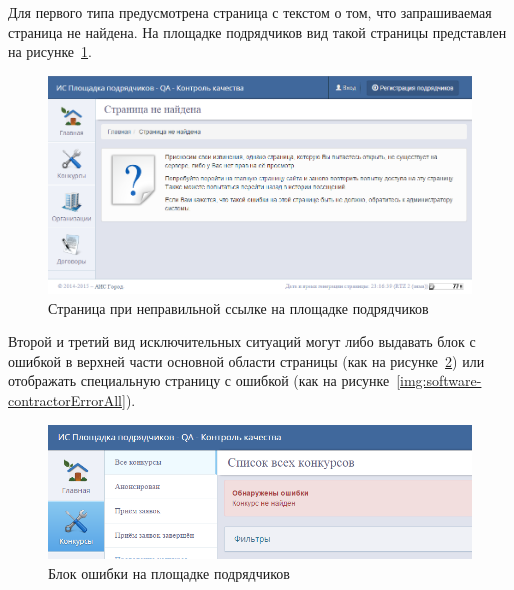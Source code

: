 Для первого типа предусмотрена страница с текстом о том, что запрашиваемая страница не найдена.
На площадке подрядчиков вид такой страницы представлен на рисунке~\ref{img:software-contractorNotFound}.

\begin{figure}[h!]
	\begin{center}
		\begin{minipage}[h]{\linewidth}
			\centering
			\includegraphics[width=\linewidth]{images/software-contractorNotFound.png}
			\caption{Страница при неправильной ссылке на площадке подрядчиков}
			\label{img:software-contractorNotFound}
		\end{minipage}
		\hfill
	\end{center}
\end{figure}

Второй и третий вид исключительных ситуаций могут либо выдавать блок с ошибкой в верхней части основной области страницы (как на рисунке~\ref{img:software-contractorErrorTop}) или отображать специальную страницу с ошибкой (как на рисунке~\ref{img:software-contractorErrorAll}).

\begin{figure}[h!]
	\begin{center}
		\begin{minipage}[h]{\linewidth}
			\centering
			\includegraphics[width=\linewidth]{images/software-contractorErrorTop.png}
			\caption{Блок ошибки на площадке подрядчиков}
			\label{img:software-contractorErrorTop}
		\end{minipage}
		\hfill
	\end{center}
\end{figure}

